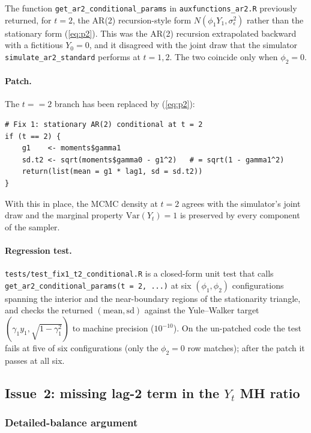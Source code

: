 \documentclass[11pt]{article}
\newcommand{\eref}[1]{(\ref{#1})}
\theoremstyle{plain}
\theoremstyle{definition}
\theoremstyle{remark}
\begin{document}
The function \texttt{get\_ar2\_conditional\_params} in
\texttt{auxfunctions\_ar2.R} previously returned, for $t = 2$, the AR(2)
recursion-style form $N(\phi_1 Y_1, \sigma_\epsilon^2)$ rather than the
stationary form \eref{eq:p2}. This was the AR(2) recursion extrapolated
backward with a fictitious $Y_0 = 0$, and it disagreed with the joint draw
that the simulator \texttt{simulate\_ar2\_standard} performs at $t = 1, 2$.
The two coincide only when $\phi_2 = 0$.

\paragraph{Patch.}
The $t == 2$ branch has been replaced by \eref{eq:p2}:
\begin{lstlisting}
# Fix 1: stationary AR(2) conditional at t = 2
if (t == 2) {
    g1    <- moments$gamma1
    sd.t2 <- sqrt(moments$gamma0 - g1^2)   # = sqrt(1 - gamma1^2)
    return(list(mean = g1 * lag1, sd = sd.t2))
}
\end{lstlisting}
With this in place, the MCMC density at $t = 2$ agrees with the
simulator's joint draw and the marginal property
$\mathrm{Var}(Y_t) = 1$ is preserved by every component of the sampler.

\paragraph{Regression test.}
\texttt{tests/test\_fix1\_t2\_conditional.R} is a closed-form unit test
that calls \texttt{get\_ar2\_conditional\_params(t = 2, ...)} at six
$(\phi_1, \phi_2)$ configurations spanning the interior and the
near-boundary regions of the stationarity triangle, and checks the
returned $(\mathrm{mean}, \mathrm{sd})$ against the Yule--Walker target
$(\gamma_1 y_1, \sqrt{1 - \gamma_1^2})$ to machine precision
($10^{-10}$). On the un-patched code the test fails at five of six
configurations (only the $\phi_2 = 0$ row matches); after the patch it
passes at all six.

\subsection{Issue~2: missing lag-2 term in the \texorpdfstring{$Y_t$}{Yt} MH ratio}\label{sec:issue2}

\subsubsection{Detailed-balance argument}
\end{document}
